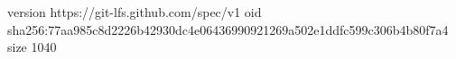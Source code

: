 version https://git-lfs.github.com/spec/v1
oid sha256:77aa985c8d2226b42930dc4e06436990921269a502e1ddfc599c306b4b80f7a4
size 1040
